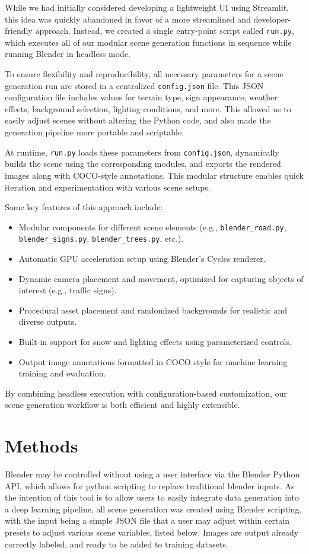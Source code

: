 \documentclass[journal]{IEEEtran}
\begin{document}
 While we had initially considered developing a lightweight UI using Streamlit, this idea was quickly abandoned in favor of a more streamlined and developer-friendly approach. Instead, we created a single entry-point script called \texttt{run.py}, which executes all of our modular scene generation functions in sequence while running Blender in headless mode.
 
 To ensure flexibility and reproducibility, all necessary parameters for a scene generation run are stored in a centralized \texttt{config.json} file. This JSON configuration file includes values for terrain type, sign appearance, weather effects, background selection, lighting conditions, and more. This allowed us to easily adjust scenes without altering the Python code, and also made the generation pipeline more portable and scriptable.
 
 At runtime, \texttt{run.py} loads these parameters from \texttt{config.json}, dynamically builds the scene using the corresponding modules, and exports the rendered images along with COCO-style annotations. This modular structure enables quick iteration and experimentation with various scene setups.
 
 Some key features of this approach include:
 
 \begin{itemize}
     \item Modular components for different scene elements (e.g., \texttt{blender\_road.py}, \texttt{blender\_signs.py}, \texttt{blender\_trees.py}, etc.).
     \item Automatic GPU acceleration setup using Blender's Cycles renderer.
     \item Dynamic camera placement and movement, optimized for capturing objects of interest (e.g., traffic signs).
     \item Procedural asset placement and randomized backgrounds for realistic and diverse outputs.
     \item Built-in support for snow and lighting effects using parameterized controls.
     \item Output image annotations formatted in COCO style for machine learning training and evaluation.
 \end{itemize}
 
 By combining headless execution with configuration-based customization, our scene generation workflow is both efficient and highly extensible.

 \section{Methods}
Blender may be controlled without using a user interface via the Blender Python API, which allows for python scripting to replace traditional blender inputs. As the intention of this tool is to allow users to easily integrate data generation into a deep learning pipeline, all scene generation was created using Blender scripting, with the input being a simple JSON file that a user may adjust within certain presets to adjust various scene variables, listed below. Images are output already correctly labeled, and ready to be added to training datasets. 
\end{document}
